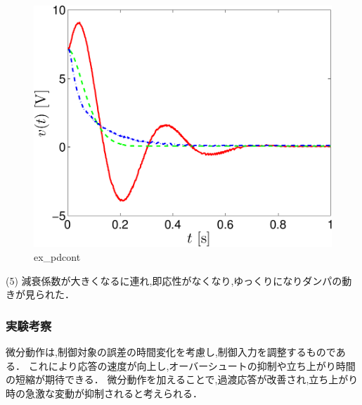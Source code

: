 \begin{figure}[h]
  \centering
  \includegraphics[scale=0.5]{sozai/figure_pdcont_volt-crop.pdf}
  \caption{ex\_pdcont}
\end{figure}

\newpage

(5) 減衰係数が大きくなるに連れ,即応性がなくなり,ゆっくりになりダンパの動きが見られた．

\subsubsection{実験考察}
微分動作は,制御対象の誤差の時間変化を考慮し,制御入力を調整するものである．
これにより応答の速度が向上し,オーバーシュートの抑制や立ち上がり時間の短縮が期待できる．
微分動作を加えることで,過渡応答が改善され,立ち上がり時の急激な変動が抑制されると考えられる．

